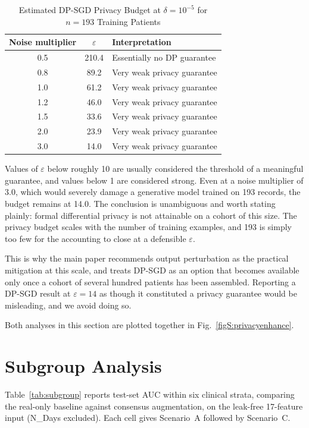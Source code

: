 \documentclass[journal,onecolumn]{IEEEtran}
\begin{document}
\begin{table}[!t]
  \centering
  \caption{Estimated DP-SGD Privacy Budget at $\delta = 10^{-5}$ for $n = 193$ Training Patients}
  \label{tab:dpsgd}
  \begin{tabular}{ccl}
    \toprule
    Noise multiplier & $\varepsilon$ & Interpretation \\
    \midrule
    0.5 & 210.4 & Essentially no DP guarantee \\
    0.8 & 89.2 & Very weak privacy guarantee \\
    1.0 & 61.2 & Very weak privacy guarantee \\
    1.2 & 46.0 & Very weak privacy guarantee \\
    1.5 & 33.6 & Very weak privacy guarantee \\
    2.0 & 23.9 & Very weak privacy guarantee \\
    3.0 & 14.0 & Very weak privacy guarantee \\
    \bottomrule
  \end{tabular}
\end{table}

Values of $\varepsilon$ below roughly 10 are usually considered the threshold of a meaningful guarantee, and values below 1 are considered strong. Even at a noise multiplier of 3.0, which would severely damage a generative model trained on 193 records, the budget remains at 14.0. The conclusion is unambiguous and worth stating plainly: formal differential privacy is not attainable on a cohort of this size. The privacy budget scales with the number of training examples, and 193 is simply too few for the accounting to close at a defensible $\varepsilon$.

This is why the main paper recommends output perturbation as the practical mitigation at this scale, and treats DP-SGD as an option that becomes available only once a cohort of several hundred patients has been assembled. Reporting a DP-SGD result at $\varepsilon = 14$ as though it constituted a privacy guarantee would be misleading, and we avoid doing so.

Both analyses in this section are plotted together in Fig.~\ref{figS:privacyenhance}.

\section{Subgroup Analysis}

Table~\ref{tab:subgroup} reports test-set AUC within six clinical strata, comparing the real-only baseline against consensus augmentation, on the leak-free 17-feature input (N\_Days excluded). Each cell gives Scenario~A followed by Scenario~C.
\end{document}
